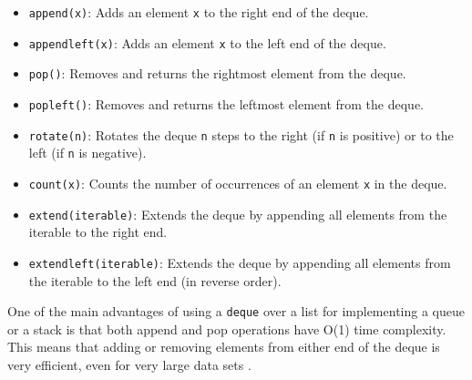 \documentclass[12pt,oneside]{article}
\begin{document}
\begin{itemize}
  \item \texttt{append(x)}: Adds an element \texttt{x} to the right end of the deque.
  \item \texttt{appendleft(x)}: Adds an element \texttt{x} to the left end of the deque.
  \item \texttt{pop()}: Removes and returns the rightmost element from the deque.
  \item \texttt{popleft()}: Removes and returns the leftmost element from the deque.
  \item \texttt{rotate(n)}: Rotates the deque \texttt{n} steps to the right (if \texttt{n} is positive) or to the left (if \texttt{n} is negative).
  \item \texttt{count(x)}: Counts the number of occurrences of an element \texttt{x} in the deque.
  \item \texttt{extend(iterable)}: Extends the deque by appending all elements from the iterable to the right end.
  \item \texttt{extendleft(iterable)}: Extends the deque by appending all elements from the iterable to the left end (in reverse order).
\end{itemize}

One of the main advantages of using a \texttt{deque} over a list for implementing a queue or a stack is that both append and pop operations have O(1) time complexity. This means that adding or removing elements from either end of the deque is very efficient, even for very large data sets \cite{python-docs}.
\end{document}
